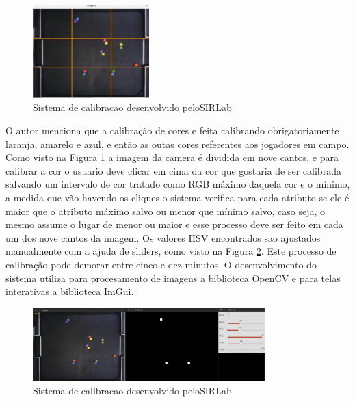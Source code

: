 \begin{figure}[!h]
	\centering
	\includegraphics[width=0.4\textwidth]{vssvision.pdf} 	
	\caption{Sistema de calibracao desenvolvido peloSIRLab \cite{Rosa:2015}}
	\label{SIRLabCalibracao}
\end{figure}
O autor menciona que a calibração de cores e feita calibrando obrigatoriamente laranja, amarelo e azul, e então as outas cores referentes aos jogadores em campo. Como visto na Figura \ref{SIRLabCalibracao} a imagem da camera é dividida em nove cantos, e para calibrar a cor o usuario deve clicar em cima da cor que gostaria de ser calibrada salvando um intervalo de cor tratado como RGB máximo daquela cor e o mínimo, a medida
que vão havendo os cliques o sistema verifica para cada atributo se ele é maior que o atributo
máximo salvo ou menor que mínimo salvo, caso seja, o mesmo assume o lugar de menor ou
maior\cite{Rosa:2015} e esse processo deve ser feito em cada um dos nove cantos da imagem. Os valores HSV encontrados sao ajustados manualmente com a ajuda de sliders, como visto na Figura \ref{SIRLabCalibracaoHSV}. Este processo de calibração pode demorar entre cinco e dez minutos.
O desenvolvimento do sistema utiliza para procesamento de imagens a biblioteca OpenCV e para telas interativas a biblioteca  ImGui.

\begin{figure}[!h]
	\centering
	\includegraphics[width=0.8\textwidth]{calibration.pdf} 	
	\caption{Sistema de calibracao desenvolvido peloSIRLab \cite{VSSVision}}
	\label{SIRLabCalibracaoHSV}
\end{figure}

